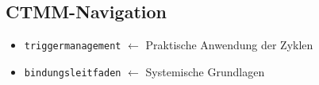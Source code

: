 \subsection*{\texorpdfstring{\textcolor{ctmmBlue}{CTMM-Navigation}}{CTMM-Navigation}}
\begin{itemize}
  \item \texttt{triggermanagement} $\leftarrow$ Praktische Anwendung der Zyklen
  \item \texttt{bindungsleitfaden} $\leftarrow$ Systemische Grundlagen
\end{itemize}

